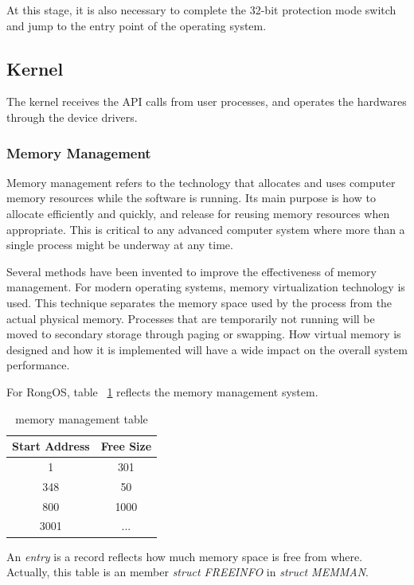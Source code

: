 \documentclass{swfcthesis}
\begin{document}
At this stage, it is also necessary to complete the 32-bit protection mode switch and jump
to the entry point of the operating system.

\subsection{Kernel}
\label{sec:kernel}

The kernel receives the API calls from user processes, and operates the
hardwares through the device drivers.

\subsubsection{Memory Management}
\label{sec:memory-management-1}

Memory management refers to the technology that allocates and uses computer memory
resources while the software is running. Its main purpose is how to allocate efficiently
and quickly, and release for reusing memory resources when appropriate. This is critical
to any advanced computer system where more than a single process might be underway at any
time.

Several methods have been invented to improve the effectiveness of memory management. For
modern operating systems, memory virtualization technology is used. This technique
separates the memory space used by the process from the actual physical memory. Processes
that are temporarily not running will be moved to secondary storage through paging or
swapping. How virtual memory is designed and how it is implemented will have a wide impact
on the overall system performance.

For RongOS, table ~\ref{tab:memo-tab} reflects the memory management system.
\begin{table}[!ht]
  \centering
  \begin{tabular}{|c|c|}
    \hline
    Start Address & Free Size \\
    \hline
    1 & 301 \\
    \hline
    348 & 50 \\
    \hline
    800 & 1000 \\
    \hline
    3001 & ... \\
    \hline
  \end{tabular}
  \caption{memory management table}
  \label{tab:memo-tab}
\end{table}
An \emph{entry} is a record reflects how much memory space is free from where. Actually,
this table is an member \emph{struct FREEINFO} in \emph{struct MEMMAN}.
\end{document}
